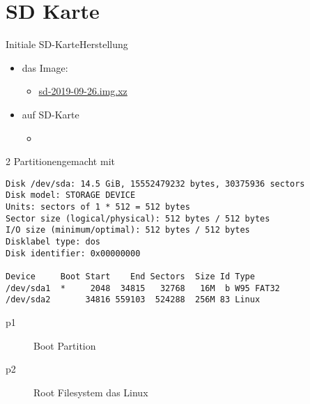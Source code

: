 \section{SD Karte}
\begin{frame}{Initiale SD-Karte}{Herstellung}
 \begin{itemize}
  \item das Image:
  \begin{itemize}
   \item \href{https://drive.switch.ch/index.php/s/VDDlivnHq2QQ8m9}{sd-2019-09-26.img.xz}
  \end{itemize}
  \item auf SD-Karte
  \begin{itemize}
   \item {}
  \end{itemize}
 \end{itemize}
\end{frame}

\begin{frame}[fragile]{2 Partitionen}{gemacht mit }
{
\footnotesize
\begin{verbatim}
Disk /dev/sda: 14.5 GiB, 15552479232 bytes, 30375936 sectors
Disk model: STORAGE DEVICE  
Units: sectors of 1 * 512 = 512 bytes
Sector size (logical/physical): 512 bytes / 512 bytes
I/O size (minimum/optimal): 512 bytes / 512 bytes
Disklabel type: dos
Disk identifier: 0x00000000

Device     Boot Start    End Sectors  Size Id Type
/dev/sda1  *     2048  34815   32768   16M  b W95 FAT32
/dev/sda2       34816 559103  524288  256M 83 Linux
\end{verbatim}
}
\begin{description}
 \item[p1] Boot Partition
 \item[p2] Root Filesystem das Linux
\end{description}
\end{frame}

